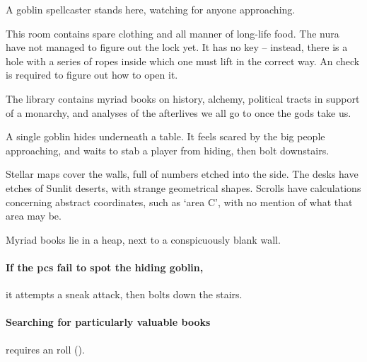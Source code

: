 \begin{multicols}{2}

A goblin spellcaster stands here, watching for anyone approaching.

\goblincaster

\showStdSpells


This room contains spare clothing and all manner of long-life food.
The nura have not managed to figure out the lock yet.
It has no key -- instead, there is a hole with a series of ropes inside which one must lift in the correct way.
An  check \tn[10] is required to figure out how to open it.


The library contains myriad books on history, alchemy, political tracts in support of a monarchy, and analyses of the afterlives we all go to once the gods take us.

A single goblin hides underneath a table.
It feels scared by the big people approaching, and waits to stab a player from hiding, then bolt downstairs.

\begin{boxtext}

  Stellar maps cover the walls, full of numbers etched into the side.
  The desks have etches of Sunlit deserts, with strange geometrical shapes.
  Scrolls have calculations concerning abstract coordinates, such as `area C', with no mention of what that area may be.

  Myriad books lie in a heap, next to a conspicuously blank wall.

\end{boxtext}



\paragraph{If the \glspl{pc} fail to spot the hiding goblin,}
it attempts a sneak attack, then bolts down the stairs.

\paragraph{Searching for particularly valuable books}
requires an  roll (\tn[12]).


\end{multicols}
